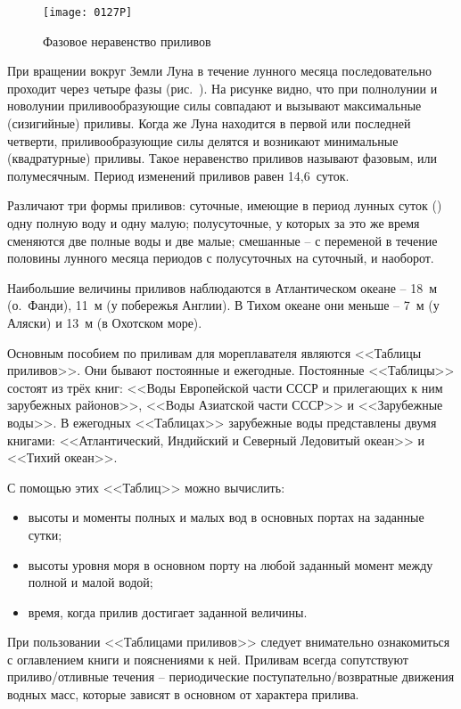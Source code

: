 \begin{figure}[!htb]
  \centering{}
  \texttt{[image: 0127P]}
  \caption{Фазовое неравенство приливов}
  \label{fig:127}
\end{figure}

При вращении вокруг Земли Луна в течение лунного месяца
последовательно проходит через четыре фазы (рис.~). На
рисунке видно, что при полнолунии и новолунии приливообразующие силы
совпадают и вызывают максимальные (сизигийные) приливы. Когда же Луна
находится в первой или последней четверти, приливообразующие силы
делятся и возникают минимальные (квадратурные) приливы. Такое
неравенство приливов называют фазовым, или полумесячным. Период
изменений приливов равен 14,6~суток.

Различают три формы приливов: суточные, имеющие в период лунных суток
() одну полную воду и одну малую; полусуточные, у которых
за это же время сменяются две полные воды и две малые; смешанные \---
с переменой в течение половины лунного месяца периодов с полусуточных
на суточный, и наоборот.

Наибольшие величины приливов наблюдаются в Атлантическом океане \---
18~м (о.~Фанди), 11~м (у побережья Англии). В Тихом океане они
меньше \--- 7~м (у Аляски) и 13~м (в Охотском море).

Основным пособием по приливам для мореплавателя являются <<Таблицы
приливов>>. Они бывают постоянные и ежегодные. Постоянные <<Таблицы>>
состоят из трёх книг: <<Воды Европейской части СССР и прилегающих к
ним зарубежных районов>>, <<Воды Азиатской части СССР>> и <<Зарубежные
воды>>. В ежегодных <<Таблицах>> зарубежные воды представлены двумя
книгами: <<Атлантический, Индийский и Северный Ледовитый океан>> и
<<Тихий океан>>.

С помощью этих <<Таблиц>> можно вычислить:
\begin{itemize}
\item высоты и моменты полных и малых вод в основных портах на
  заданные сутки;
\item высоты уровня моря в основном порту на любой заданный момент
  между полной и малой водой;
\item время, когда прилив достигает заданной величины.
\end{itemize}

При пользовании <<Таблицами приливов>> следует внимательно
ознакомиться с оглавлением книги и пояснениями к ней.  Приливам всегда
сопутствуют приливо\-/отливные течения \--- периодические
поступательно\-/возвратные движения водных масс, которые зависят в
основном от характера прилива.

